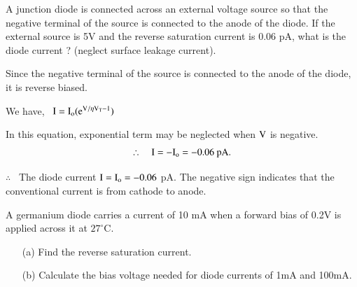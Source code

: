 \begin{problem}\label{prop1.3}
A junction diode is connected across an external voltage source so that the negative terminal of the source is connected to the anode of the diode. If the external source is 5V and the reverse saturation current is 0.06 pA, what is the diode current ? (neglect surface leakage current).
\end{problem}

\begin{solution}
Since the negative terminal of the source is connected to the anode of the diode, it is reverse biased.

We have, \ $\textrm{I}=\textrm{I}_{\textrm{o}}(\textrm{e}^{\textrm{V}/\eta \textrm{V}_{\textrm{T}}-1})$

In this equation, exponential term may be neglected when $\textrm{V}$ is negative. 
$$
\therefore\quad \textrm{I}=-\textrm{I}_{\textrm{o}}=-0.06\text{~pA.}
$$

$\therefore$~ The diode current $\textrm{I}=\textrm{I}_{\textrm{o}}=-0.06$ pA. The negative sign indicates that the conventional current is from cathode to anode.
\end{solution}

\eject

\begin{problem}\label{prob1.4}
A germanium diode carries a current of 10 mA when a forward bias of 0.2V is applied across it at $27^{\circ}$C.
\begin{itemize}
\item[(a)] Find the reverse saturation current.

\item[(b)] Calculate the bias voltage needed for diode currents of 1mA and 100mA.
\end{itemize}
\end{problem}

